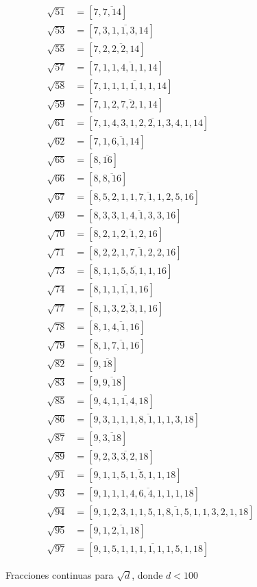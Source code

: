 \begin{figure}
\begin{multicols}{2}
    \begin{align*}
      \sqrt{51} & = [7,\overline{7,14}] \\
      \sqrt{53} & = [7,\overline{3,1,1,3,14}] \\
      \sqrt{55} & = [7,\overline{2,2,2,14}] \\
      \sqrt{57} & = [7,\overline{1,1,4,1,1,14}] \\
      \sqrt{58} & = [7,\overline{1,1,1,1,1,1,14}] \\
      \sqrt{59} & = [7,\overline{1,2,7,2,1,14}] \\
      \sqrt{61} & = [7,\overline{1,4,3,1,2,2,1,3,4,1,14}] \\
      \sqrt{62} & = [7,\overline{1,6,1,14}] \\
      \sqrt{65} & = [8,\overline{16}] \\
      \sqrt{66} & = [8,\overline{8,16}] \\
      \sqrt{67} & = [8,\overline{5,2,1,1,7,1,1,2,5,16}] \\
      \sqrt{69} & = [8,\overline{3,3,1,4,1,3,3,16}] \\
      \sqrt{70} & = [8,\overline{2,1,2,1,2,16}] \\
      \sqrt{71} & = [8,\overline{2,2,1,7,1,2,2,16}] \\
      \sqrt{73} & = [8,\overline{1,1,5,5,1,1,16}] \\
      \sqrt{74} & = [8,\overline{1,1,1,1,16}] \\
      \sqrt{77} & = [8,\overline{1,3,2,3,1,16}] \\
      \sqrt{78} & = [8,\overline{1,4,1,16}] \\
      \sqrt{79} & = [8,\overline{1,7,1,16}] \\
      \sqrt{82} & = [9,\overline{18}] \\
      \sqrt{83} & = [9,\overline{9,18}] \\
      \sqrt{85} & = [9,\overline{4,1,1,4,18}] \\
      \sqrt{86} & = [9,\overline{3,1,1,1,8,1,1,1,3,18}] \\
      \sqrt{87} & = [9,\overline{3,18}] \\
      \sqrt{89} & = [9,\overline{2,3,3,2,18}] \\
      \sqrt{91} & = [9,\overline{1,1,5,1,5,1,1,18}] \\
      \sqrt{93} & = [9,\overline{1,1,1,4,6,4,1,1,1,18}] \\
      \sqrt{94} & = [9,\overline{1,2,3,1,1,5,1,8,1,5,1,1,3,2,1,18}] \\
      \sqrt{95} & = [9,\overline{1,2,1,18}] \\
      \sqrt{97} & = [9,\overline{1,5,1,1,1,1,1,1,5,1,18}]
    \end{align*}
  \end{multicols}

  \caption{Fracciones continuas para $\sqrt{d}$, donde $d < 100$}
  \label{fig:fracciones-continuas-para-sqrt-d}
\end{figure}

